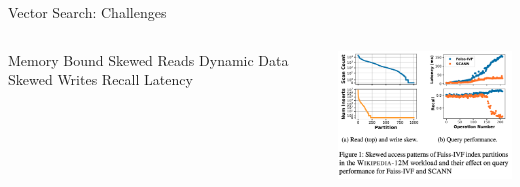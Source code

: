 \placelogofalse
\begin{frame}{Vector Search: Challenges}
\begin{columns}
\centering
\begin{outline}
  \1 Memory Bound
  \1 Skewed Reads
  \1 Dynamic Data 
  \1 Skewed Writes
  \1 Recall
  \1 Latency 
\end{outline}

\begin{center}
\centering
\includegraphics[width=7cm]{assets/fig_1_t2.png}

\end{center}
\end{columns}
\end{frame}
\placelogotrue



